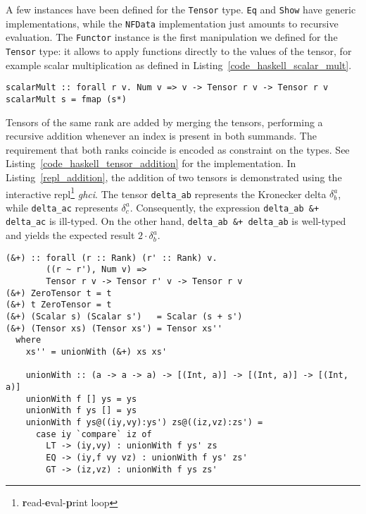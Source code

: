 A few instances have been defined for the \texttt{Tensor} type. \texttt{Eq} and \texttt{Show} have generic implementations, while the \texttt{NFData} implementation just amounts to recursive evaluation. The \texttt{Functor} instance is the first manipulation we defined for the \texttt{Tensor} type: it allows to apply functions directly to the values of the tensor, for example scalar multiplication as defined in Listing~\ref{code_haskell_scalar_mult}.
\begin{code}
  \begin{verbatim}
scalarMult :: forall r v. Num v => v -> Tensor r v -> Tensor r v
scalarMult s = fmap (s*)
  \end{verbatim}
  \label{code_haskell_scalar_mult}
\end{code}
Tensors of the same rank are added by merging the tensors, performing a recursive addition whenever an index is present in both summands. The requirement that both ranks coincide is encoded as constraint on the types. See Listing~\ref{code_haskell_tensor_addition} for the implementation. In Listing~\ref{repl_addition}, the addition of two tensors is demonstrated using the interactive repl\footnote{\textbf{r}ead-\textbf{e}val-\textbf{p}rint loop} \emph{ghci}. The tensor \texttt{delta_ab} represents the Kronecker delta $\delta^a_b$, while \texttt{delta_ac} represents $\delta^a_c$. Consequently, the expression \texttt{delta_ab &+ delta_ac} is ill-typed. On the other hand, \texttt{delta_ab &+ delta_ab} is well-typed and yields the expected result $2\cdot\delta^a_b$.
\begin{code}
  \begin{verbatim}
(&+) :: forall (r :: Rank) (r' :: Rank) v.
        ((r ~ r'), Num v) =>
        Tensor r v -> Tensor r' v -> Tensor r v
(&+) ZeroTensor t = t
(&+) t ZeroTensor = t
(&+) (Scalar s) (Scalar s')   = Scalar (s + s')
(&+) (Tensor xs) (Tensor xs') = Tensor xs''
  where
    xs'' = unionWith (&+) xs xs'

    unionWith :: (a -> a -> a) -> [(Int, a)] -> [(Int, a)] -> [(Int, a)]
    unionWith f [] ys = ys
    unionWith f ys [] = ys
    unionWith f ys@((iy,vy):ys') zs@((iz,vz):zs') =
      case iy `compare` iz of
        LT -> (iy,vy) : unionWith f ys' zs
        EQ -> (iy,f vy vz) : unionWith f ys' zs'
        GT -> (iz,vz) : unionWith f ys zs'
  \end{verbatim}
  \label{code_haskell_tensor_addition}
\end{code}
